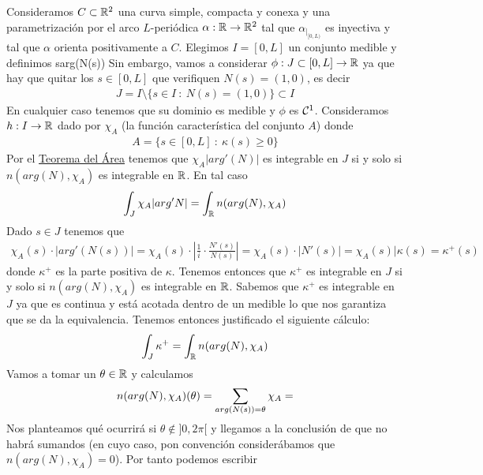 \begin{ejemplo}
    Consideramos $C\subset \mathbb{R}^2$ una curva simple, compacta y conexa y una parametrización por el arco $L$-periódica $\alpha: \mathbb{R} \to \mathbb{R}^2$ tal que $\alpha_{|_{[0,L)}}$ es inyectiva y tal que $\alpha$ orienta positivamente a $C$. Elegimos $I=[0,L]$ un conjunto medible y definimos
         {s}{arg(N(s))}
    Sin embargo, vamos a considerar $\phi: J\subset [0,L] \to \mathbb{R}$ ya que hay que quitar los $s\in [0,L]$ que verifiquen $N(s)=(1,0)$, es decir
    \begin{gather*}
        J = I \setminus \{ s\in I \ : \ N(s)=(1,0) \}\subset I
    \end{gather*}
    En cualquier caso tenemos que su dominio es medible y $\phi$ es $\mathcal{C}^1$. Consideramos $h: I \to \mathbb{R}$ dado por $\chi_A$ (la función característica del conjunto $A$) donde 
    \begin{gather*}
        A = \{s\in [0,L] \ : \ \kappa(s) \geq 0 \}
    \end{gather*}
    Por el \hyperref[teo:area]{Teorema del Área} tenemos que $\chi_A|arg'(N)|$ es integrable en $J$ si y solo si $n(arg(N), \chi_A)$ es integrable en $\mathbb{R}$. En tal caso
    \begin{gather*}
        \int_J \chi_A |arg'N| = \int_{\mathbb{R}} n(arg(N), \chi_A)
    \end{gather*}
    Dado $s\in J$ tenemos que 
    \begin{gather*}
        \chi_A(s) \cdot |arg'(N(s))| = \chi_A(s) \cdot \left| \frac{1}{i} \cdot \frac{N'(s)}{N(s)} \right| = \chi_A(s) \cdot |N'(s)| = \chi_A(s)|\kappa(s) = \kappa^+(s)
    \end{gather*}
    donde $\kappa^+$ es la parte positiva de $\kappa$. Tenemos entonces que $\kappa^+$ es integrable en $J$ si y solo si $n(arg(N), \chi_A)$ es integrable en $\mathbb{R}$. Sabemos que $\kappa^+$ es integrable en $J$ ya que es continua y está acotada dentro de un medible lo que nos garantiza que se da la equivalencia. Tenemos entonces justificado el siguiente cálculo:
    \begin{gather*}
        \int_J \kappa^+ = \int_{\mathbb{R}} n(arg(N), \chi_A)
    \end{gather*}
    Vamos a tomar un $\theta \in \mathbb{R}$ y calculamos
    \begin{gather*}
        n(arg(N), \chi_A)(\theta) = \sum_{\smash{arg(N(s))=\theta}} \chi_A = 
    \end{gather*}
    Nos planteamos qué ocurrirá si $\theta\notin ]0,2\pi[$ y llegamos a la conclusión de que no habrá sumandos (en cuyo caso, pon convención considerábamos que $n(arg(N), \chi_A)=0$). Por tanto podemos escribir

\end{ejemplo}
